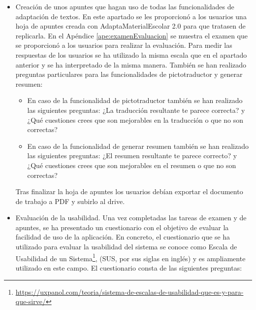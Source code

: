 \begin{itemize}
          Tras finalizar el examen los usuarios debían exportar el documento de trabajo a PDF y subirlo al drive.

          Para medir las respuestas de los usuarios, se ha utilizado la Escala de Likert\footnote{\url{https://es.wikipedia.org/wiki/Escala_Likert}} de 5 puntos. Esta escala va del 1 al 5, donde el valor más bajo, 1, indica que el usuario está ``Muy en desacuerdo'' con la afirmación de la pregunta, y el valor más alto, 5, indica que el usuario está ``Muy de acuerdo''.
    \item Creación de unos apuntes que hagan uso de todas las funcionalidades de adaptación de textos. En este apartado se les proporcionó a los usuarios una hoja de apuntes creada con AdaptaMaterialEscolar 2.0 para que tratasen de replicarla. En el Apéndice \ref{ape:examenEvaluacion} se muestra el examen que se proporcionó a los usuarios para realizar la evaluación. Para medir las respuestas de los usuarios se ha utilizado la misma escala que en el apartado anterior y se ha interpretado de la misma manera. También se han realizado preguntas particulares para las funcionalidades de pictotraductor y generar resumen:
          \begin{itemize}
              \item En caso de la funcionalidad de pictotraductor también se han realizado las siguientes preguntas: ¿La traducción resultante te parece correcta? y ¿Qué cuestiones crees que son mejorables en la traducción o que no son correctas?
              \item En caso de la funcionalidad de generar resumen también se han realizado las siguientes preguntas: ¿El resumen resultante te parece correcto? y ¿Qué cuestiones crees que son mejorables en el resumen o que no son correctas?
          \end{itemize}
          Tras finalizar la hoja de apuntes los usuarios debían exportar el documento de trabajo a PDF y subirlo al drive.
    \item Evaluación de la usabilidad. Una vez completadas las tareas de examen y de apuntes, se ha presentado un cuestionario con el objetivo de evaluar la facilidad de uso de la aplicación. En concreto, el cuestionario que se ha utilizado para evaluar la usabilidad del sistema se conoce como Escala de Usabilidad de un Sistema\footnote{\url{https://uxpanol.com/teoria/sistema-de-escalas-de-usabilidad-que-es-y-para-que-sirve/}}, (SUS, por sus siglas en inglés) y es ampliamente utilizado en este campo. El cuestionario consta de las siguientes preguntas:

\end{itemize}
